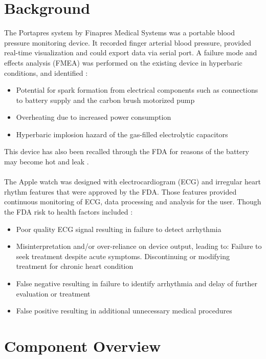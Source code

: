 \documentclass{article}
\begin{document}
	\section{Background}
    The Portapres system by Finapres Medical Systems was a portable blood pressure monitoring device. It recorded finger arterial blood pressure, provided real-time visualization and could export data via serial port. A failure mode and effects analysis (FMEA) was performed on the existing device in hyperbaric conditions, and identified \cite{bg1}:
    \begin{itemize}
        \item Potential for spark formation from electrical components such as connections to battery supply and the carbon brush motorized pump
        \item Overheating due to increased power consumption
        \item Hyperbaric implosion hazard of the gas-filled electrolytic capacitors
    \end{itemize}
    This device has also been recalled through the FDA for reasons of the battery may become hot and leak \cite{bg2}.\\ \\
    The Apple watch was designed with electrocardiogram (ECG) and irregular heart rhythm features that were approved by the FDA. Those features provided continuous monitoring of ECG, data processing and analysis for the user. Though the FDA risk to health factors included \cite{bg3, bg4}:
    \begin{itemize}
        \item Poor quality ECG signal resulting in failure to detect arrhythmia 
        \item Misinterpretation and/or over-reliance on device output, leading to: Failure to seek treatment despite acute symptoms. Discontinuing or modifying treatment for chronic heart condition
        \item False negative resulting in failure to identify arrhythmia and delay of further evaluation or treatment
        \item False positive resulting in additional unnecessary medical procedures 

    \end{itemize}
    \section{Component Overview}
    
\end{document}
